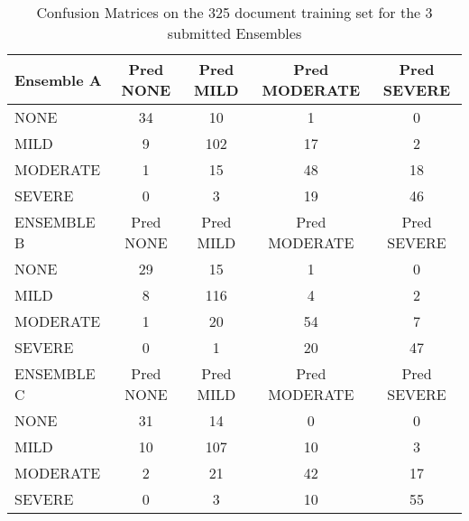 \begin{table}
\centering
    \begin{tabular}{|l|c|c|c|c|}
   \hline
   \textsf{ \cellcolor{gray!15} Ensemble A } & \textsf{ Pred NONE } & \textsf{ Pred MILD } & \textsf{ Pred MODERATE } & \textsf{ Pred SEVERE } \\ 
    \hline
    \textsf{ NONE } & \cellcolor{gray!15} 34 & 10 & 1 & 0 \\ 
    \textsf{ MILD } & 9 & \cellcolor{gray!15} 102 & 17 & 2 \\ 
    \textsf{ MODERATE } & 1 & 15 & \cellcolor{gray!15} 48 & 18 \\ 
    \textsf{ SEVERE } & 0 & 3 & 19 & \cellcolor{gray!15} 46 \\ 
   \hline
   \textsf{ \cellcolor{gray!15} ENSEMBLE B } & \textsf{ Pred NONE } & \textsf{ Pred MILD } & \textsf{ Pred MODERATE } & \textsf{ Pred SEVERE } \\ 
    \hline
    \textsf{ NONE } & \cellcolor{gray!15} 29 & 15 & 1 & 0 \\ 
    \textsf{ MILD } & 8 & \cellcolor{gray!15} 116 & 4 & 2 \\ 
    \textsf{ MODERATE } & 1 & 20 & \cellcolor{gray!15} 54 & 7 \\ 
    \textsf{ SEVERE } & 0 & 1 & 20 & \cellcolor{gray!15} 47 \\ 
   \hline
   \textsf{ \cellcolor{gray!15} ENSEMBLE C } & \textsf{ Pred NONE } & \textsf{ Pred MILD } & \textsf{ Pred MODERATE } & \textsf{ Pred SEVERE } \\ 
    \hline
    \textsf{ NONE } & \cellcolor{gray!15} 31 & 14 & 0 & 0 \\ 
    \textsf{ MILD } & 10 & \cellcolor{gray!15} 107 & 10 & 3 \\ 
    \textsf{ MODERATE } & 2 & 21 & \cellcolor{gray!15} 42 & 17 \\ 
    \textsf{ SEVERE } & 0 & 3 & 10 & \cellcolor{gray!15} 55 \\ 
    \hline
    \end{tabular}    
    \caption{Confusion Matrices on the 325 document training set for the 3 submitted Ensembles}
    \label{tab:EnsembleTrainConfusionMatrix}
\end{table}

